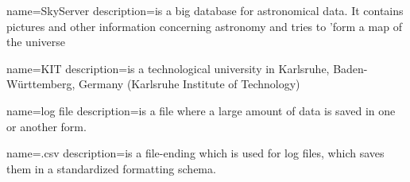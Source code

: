 
{
  name=SkyServer
  description={is a big database for astronomical data. It contains pictures
              and other information concerning astronomy and tries to 'form a 
              map of the universe
              }
}


{
  name=KIT
  description={is a technological university in Karlsruhe, Baden-Württemberg, Germany 
              (Karlsruhe Institute of Technology)
              }
}

{
  name=log file
  description={is a file where a large amount of data is saved in one or another form.}
}

{
  name=.csv
  description={is a file-ending which is used for log files, 
  which saves them in a standardized formatting schema.}
}
